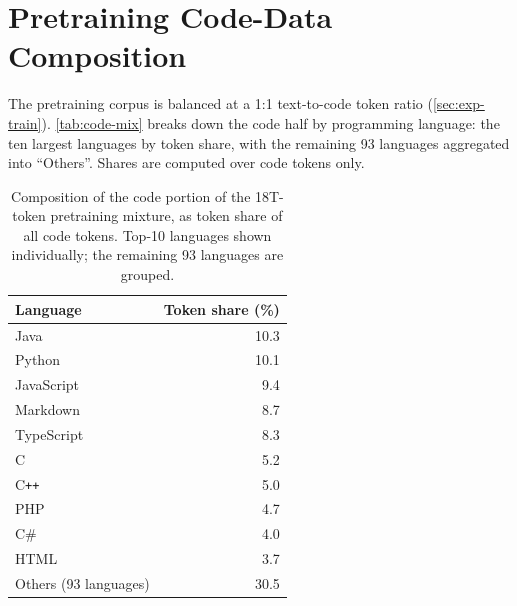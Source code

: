 \documentclass[11pt, a4paper, logo, copyright, nonumbering]{map}
\begin{document}


\section{Pretraining Code-Data Composition}
\label{app:code-mix}

The pretraining corpus is balanced at a 1:1 text-to-code token ratio
(\autoref{sec:exp-train}). \autoref{tab:code-mix} breaks down the code half by
programming language: the ten largest languages by token share, with the
remaining 93 languages aggregated into ``Others''. Shares are computed over
code tokens only.

\begin{table}[h]
\centering
\caption{Composition of the code portion of the 18T-token pretraining mixture,
as token share of all code tokens. Top-10 languages shown individually; the
remaining 93 languages are grouped.}
\label{tab:code-mix}
\begin{tabular}{lr}
\toprule
\textbf{Language} & \textbf{Token share (\%)} \\
\midrule
Java                & 10.3 \\
Python              & 10.1 \\
JavaScript          & 9.4 \\
Markdown            & 8.7 \\
TypeScript          & 8.3 \\
C                   & 5.2 \\
C\texttt{++}        & 5.0 \\
PHP                 & 4.7 \\
C\#                 & 4.0 \\
HTML                & 3.7 \\
\midrule
Others (93 languages) & 30.5 \\
\bottomrule
\end{tabular}
\end{table}
\end{document}
